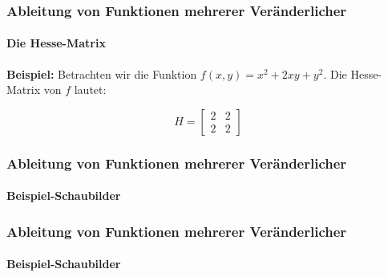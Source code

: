 \documentclass{beamer}
\begin{document}
\begin{frame}
    \frametitle{Ableitung von Funktionen mehrerer Veränderlicher}
    \framesubtitle{Die Hesse-Matrix}
    \textbf{Beispiel:} Betrachten wir die Funktion $f(x, y) = x^2 + 2xy + y^2$. Die Hesse-Matrix von $f$ lautet:
  
  \[
  H =
  \begin{bmatrix}
    2 & 2 \\
    2 & 2
  \end{bmatrix}
  \]
  \end{frame}

  \begin{frame}
    \frametitle{Ableitung von Funktionen mehrerer Veränderlicher}
    \framesubtitle{Beispiel-Schaubilder}
  
    \begin{center}
    \end{center}
  \end{frame}  
  

\begin{frame}
    \frametitle{Ableitung von Funktionen mehrerer Veränderlicher}
    \framesubtitle{Beispiel-Schaubilder}
  
    \begin{center}
    \end{center}
  \end{frame}
\end{document}
